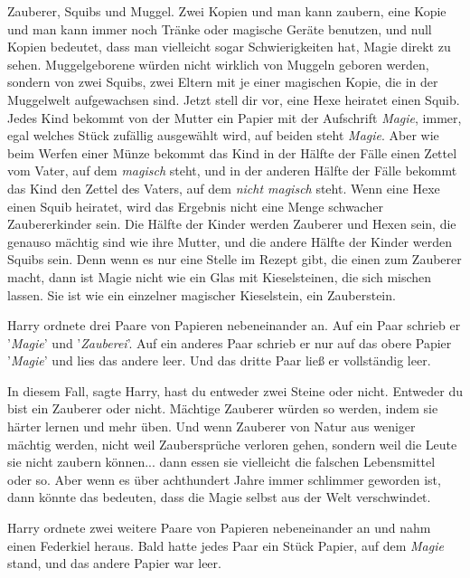 Zauberer, Squibs und Muggel. Zwei Kopien und man kann zaubern, eine Kopie und
man kann immer noch Tränke oder magische Geräte benutzen, und null Kopien
bedeutet, dass man vielleicht sogar Schwierigkeiten hat, Magie direkt zu sehen.
Muggelgeborene würden nicht wirklich von Muggeln geboren werden, sondern von
zwei Squibs, zwei Eltern mit je einer magischen Kopie, die in der Muggelwelt
aufgewachsen sind. Jetzt stell dir vor, eine Hexe heiratet einen Squib. Jedes
Kind bekommt von der Mutter ein Papier mit der Aufschrift \glqq
\emph{Magie}\grqq{}, immer, egal welches Stück zufällig ausgewählt wird, auf
beiden steht \glqq \emph{Magie}\grqq{}. Aber wie beim Werfen einer Münze bekommt
das Kind in der Hälfte der Fälle einen Zettel vom Vater, auf dem \glqq
\emph{magisch}\grqq{} steht, und in der anderen Hälfte der Fälle bekommt das
Kind den Zettel des Vaters, auf dem \emph{\glqq nicht magisch\grqq{}} steht.
Wenn eine Hexe einen Squib heiratet, wird das Ergebnis nicht eine Menge
schwacher Zaubererkinder sein. Die Hälfte der Kinder werden Zauberer und Hexen
sein, die genauso mächtig sind wie ihre Mutter, und die andere Hälfte der Kinder
werden Squibs sein. Denn wenn es nur eine Stelle im Rezept gibt, die einen zum
Zauberer macht, dann ist Magie nicht wie ein Glas mit Kieselsteinen, die sich
mischen lassen. Sie ist wie ein einzelner magischer Kieselstein, ein
Zauberstein.\grqq{}

Harry ordnete drei Paare von Papieren nebeneinander an. Auf ein Paar schrieb er
'\emph{Magie}' und '\emph{Zauberei}'. Auf ein anderes Paar schrieb er nur auf
das obere Papier '\emph{Magie}' und lies das andere leer. Und das dritte Paar
ließ er vollständig leer.

\glqq In diesem Fall\grqq{}, sagte Harry, \glqq hast du entweder zwei Steine
oder nicht. Entweder du bist ein Zauberer oder nicht. Mächtige Zauberer würden
so werden, indem sie härter lernen und mehr üben. Und wenn Zauberer von Natur
aus weniger mächtig werden, nicht weil Zaubersprüche verloren gehen, sondern
weil die Leute sie nicht zaubern können... dann essen sie vielleicht die
falschen Lebensmittel oder so. Aber wenn es über achthundert Jahre immer
schlimmer geworden ist, dann könnte das bedeuten, dass die Magie selbst aus der
Welt verschwindet.\grqq{}

Harry ordnete zwei weitere Paare von Papieren nebeneinander an und nahm einen
Federkiel heraus. Bald hatte jedes Paar ein Stück Papier, auf dem \glqq
\emph{Magie}\grqq{} stand, und das andere Papier war leer.

